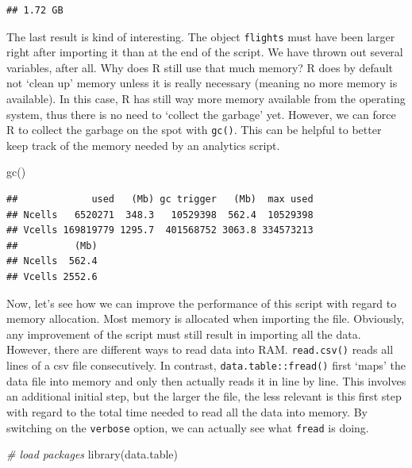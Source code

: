 \documentclass[
  12pt,
]{style/krantz}
\newenvironment{Shaded}{\begin{snugshade}}{\end{snugshade}}
\newcommand{\CommentTok}[1]{\textcolor[rgb]{0.56,0.35,0.01}{\textit{#1}}}
\newcommand{\FunctionTok}[1]{\textcolor[rgb]{0.00,0.00,0.00}{#1}}
\newcommand{\NormalTok}[1]{#1}
\begin{document}
\begin{verbatim}
## 1.72 GB
\end{verbatim}

The last result is kind of interesting. The object \texttt{flights} must have been larger right after importing it than at the end of the script. We have thrown out several variables, after all. Why does R still use that much memory? R does by default not `clean up' memory unless it is really necessary (meaning no more memory is available). In this case, R has still way more memory available from the operating system, thus there is no need to `collect the garbage' yet. However, we can force R to collect the garbage on the spot with \texttt{gc()}. This can be helpful to better keep track of the memory needed by an analytics script.

\begin{Shaded}
\begin{Highlighting}[]
\FunctionTok{gc}\NormalTok{()}
\end{Highlighting}
\end{Shaded}

\begin{verbatim}
##             used   (Mb) gc trigger   (Mb)  max used
## Ncells   6520271  348.3   10529398  562.4  10529398
## Vcells 169819779 1295.7  401568752 3063.8 334573213
##          (Mb)
## Ncells  562.4
## Vcells 2552.6
\end{verbatim}

Now, let's see how we can improve the performance of this script with regard to memory allocation. Most memory is allocated when importing the file. Obviously, any improvement of the script must still result in importing all the data. However, there are different ways to read data into RAM. \texttt{read.csv()} reads all lines of a csv file consecutively. In contrast, \texttt{data.table::fread()} first `maps' the data file into memory and only then actually reads it in line by line. This involves an additional initial step, but the larger the file, the less relevant is this first step with regard to the total time needed to read all the data into memory. By switching on the \texttt{verbose} option, we can actually see what \texttt{fread} is doing.

\begin{Shaded}
\begin{Highlighting}[]
\CommentTok{\# load packages}
\FunctionTok{library}\NormalTok{(data.table)}
\end{Highlighting}
\end{Shaded}
\end{document}
